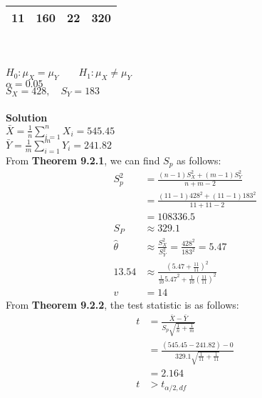 \documentclass{uofa-eng-assignment}
\begin{document}
\begin{enumerate}
\begin{tabular}{c c c c}
            11    & 160  & 22    & 320 \\
            \hline
        \end{tabular} \\ \\
        $H_0: \mu_X = \mu_Y \qquad H_1: \mu_X \neq \mu_Y$ \\
        $\alpha = 0.05$ \\
        $S_X = 428, \quad S_Y = 183$ \\ \\
        \textbf{Solution} \\
        $\bar{X} = \frac{1}{n}\sum_{i=1}^{n}X_i = 545.45$ \\
        $\bar{Y} = \frac{1}{m}\sum_{i=1}^{m}Y_i = 241.82$ \\
        From \textbf{Theorem 9.2.1}, we can find $S_p$ as follows:
        \begin{align*}
            S_p^2        & = \frac{(n-1)S_X^2 + (m-1)S_Y^2}{n+m-2}                                                     \\
                         & = \frac{(11-1)428^2 + (11-1)183^2}{11+11-2}                                                 \\
                         & = 108336.5                                                                                  \\
            S_P          & \approx 329.1                                                                               \\
            \hat{\theta} & \approx \frac{S_X^2}{S_Y^2} = \frac{428^2}{183^2} = 5.47                                    \\
            13.54        & \approx \frac{(5.47 + \frac{11}{11})^2}{\frac{1}{10}5.47^2 + \frac{1}{10}(\frac{11}{11})^2} \\
            v            & = 14
        \end{align*}
        From \textbf{Theorem 9.2.2}, the test statistic is as follows:
        \begin{align*}
            t              & = \frac{\bar{X} - \bar{Y}}{S_p\sqrt{\frac{1}{n} + \frac{1}{m}}}         \\
                           & = \frac{(545.45 - 241.82) - 0}{329.1\sqrt{\frac{1}{11} + \frac{1}{11}}} \\
                           & = 2.164                                                                 \\
            t              & > t_{\alpha/2, df}                                                      \\

\end{align*}
\end{enumerate}
\end{document}

